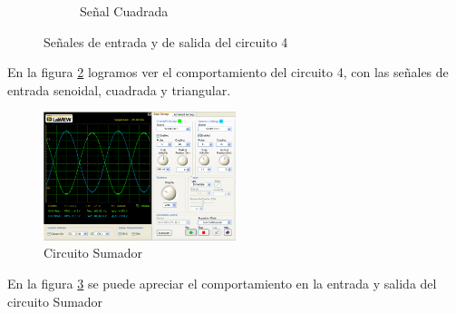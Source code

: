 \documentclass[]{article}
\begin{document}
\begin{figure}[h!]
\begin{subfigure}[b]{0.45\textwidth}
	\caption{Señal Cuadrada}
	\label{fig:circuito4cuadrada}
\end{subfigure}
	\caption{Señales de entrada y de salida del circuito 4}\label{fig:circuito4Signals}
	
\end{figure}

En la figura \ref{fig:circuito4Signals} logramos ver el comportamiento del circuito 4, con las señales de entrada senoidal, cuadrada y triangular.\\

\begin{figure}[h!]
	\centering
	\includegraphics[width=0.5\textwidth]{Imagenes/circuito5sumador.png}
	\caption{Circuito Sumador}
	\label{fig:circuito5sumador}
\end{figure}

En la figura \ref{fig:circuito5sumador} se puede apreciar el comportamiento en la entrada y salida del circuito Sumador\\
\end{document}
